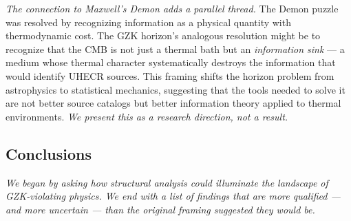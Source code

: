 \documentclass[12pt,a4paper]{article}
\begin{document}
\emph{The connection to Maxwell's Demon adds a parallel thread.} The Demon puzzle was resolved by recognizing information as a physical quantity with thermodynamic cost. The GZK horizon's analogous resolution might be to recognize that the CMB is not just a thermal bath but an \emph{information sink} --- a medium whose thermal character systematically destroys the information that would identify UHECR sources. This framing shifts the horizon problem from astrophysics to statistical mechanics, suggesting that the tools needed to solve it are not better source catalogs but better information theory applied to thermal environments. \emph{We present this as a research direction, not a result.}

\subsection{Conclusions}

\emph{We began by asking how structural analysis could illuminate the landscape of GZK-violating physics. We end with a list of findings that are more qualified --- and more uncertain --- than the original framing suggested they would be.}
\end{document}
